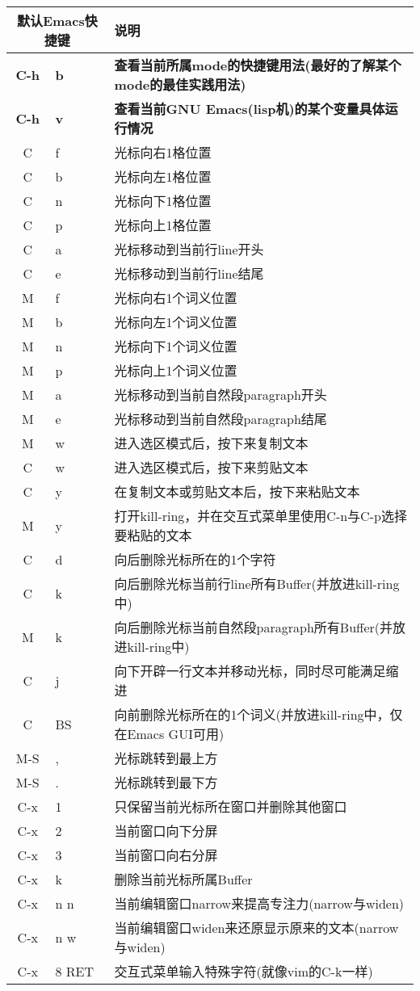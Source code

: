 \documentclass[11pt]{article}
\begin{document}
\begin{left}
  \begin{tabular}{|c|l|l|}
    \hline
    \multicolumn{2}{|c|}{默认Emacs快捷键} & 说明 \\
    \hline
    \textbf{C-h} & \textbf{b} & \textbf{查看当前所属mode的快捷键用法(最好的了解某个mode的最佳实践用法)} \\
    \textbf{C-h} & \textbf{v} & \textbf{查看当前GNU Emacs(lisp机)的某个变量具体运行情况} \\    
    C & f & 光标向右1格位置 \\ 
    C & b & 光标向左1格位置 \\ 
    C & n & 光标向下1格位置 \\ 
    C & p & 光标向上1格位置 \\
    C & a & 光标移动到当前行line开头 \\
    C & e & 光标移动到当前行line结尾 \\
    M & f & 光标向右1个词义位置 \\
    M & b & 光标向左1个词义位置 \\
    M & n & 光标向下1个词义位置 \\
    M & p & 光标向上1个词义位置 \\
    M & a & 光标移动到当前自然段paragraph开头 \\
    M & e & 光标移动到当前自然段paragraph结尾 \\    
    M & w & 进入选区模式后，按下来复制文本 \\
    C & w & 进入选区模式后，按下来剪贴文本 \\
    C & y & 在复制文本或剪贴文本后，按下来粘贴文本 \\
    M & y & 打开kill-ring，并在交互式菜单里使用C-n与C-p选择要粘贴的文本 \\
    C & d & 向后删除光标所在的1个字符 \\
    C & k & 向后删除光标当前行line所有Buffer(并放进kill-ring中) \\
    M & k & 向后删除光标当前自然段paragraph所有Buffer(并放进kill-ring中) \\
    C & j & 向下开辟一行文本并移动光标，同时尽可能满足缩进 \\
    C & BS & 向前删除光标所在的1个词义(并放进kill-ring中，仅在Emacs GUI可用) \\    
    M-S & , & 光标跳转到最上方 \\
    M-S & . & 光标跳转到最下方 \\
    C-x & 1 & 只保留当前光标所在窗口并删除其他窗口 \\
    C-x & 2 & 当前窗口向下分屏 \\
    C-x & 3 & 当前窗口向右分屏 \\
    C-x & k & 删除当前光标所属Buffer \\
    C-x & n n & 当前编辑窗口narrow来提高专注力(narrow与widen) \\
    C-x & n w & 当前编辑窗口widen来还原显示原来的文本(narrow与widen) \\
    C-x & 8 RET & 交互式菜单输入特殊字符(就像vim的C-k一样) \\
    \hline    
  \end{tabular}  
\end{left}
\end{document}
